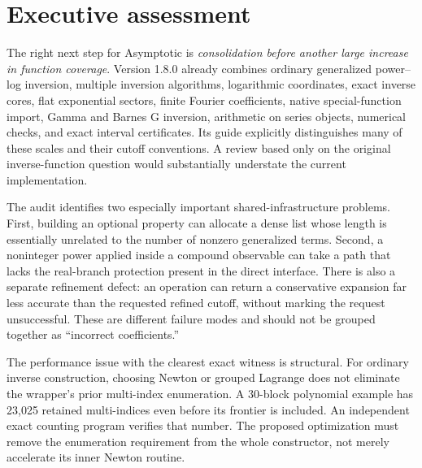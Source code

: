 \documentclass[11pt,a4paper]{article}
\newcommand{\code}[1]{\texttt{\detokenize{#1}}}
\theoremstyle{definition}
\begin{document}
\section*{Executive assessment}

The right next step for Asymptotic is \emph{consolidation before another large increase in function coverage}. Version 1.8.0 already combines ordinary generalized power--log inversion, multiple inversion algorithms, logarithmic coordinates, exact inverse cores, flat exponential sectors, finite Fourier coefficients, native special-function import, Gamma and Barnes G inversion, arithmetic on series objects, numerical checks, and exact interval certificates. Its guide explicitly distinguishes many of these scales and their cutoff conventions. A review based only on the original inverse-function question would substantially understate the current implementation.\cite{repo,guide,core}

The audit identifies two especially important shared-infrastructure problems. First, building an optional \code{SeriesData} property can allocate a dense list whose length is essentially unrelated to the number of nonzero generalized terms. Second, a noninteger power applied inside a compound observable can take a path that lacks the real-branch protection present in the direct \code{SeriesPower} interface. There is also a separate refinement defect: an operation can return a conservative expansion far less accurate than the requested refined cutoff, without marking the request unsuccessful. These are different failure modes and should not be grouped together as ``incorrect coefficients.''\cite{core,operations}

The performance issue with the clearest exact witness is structural. For ordinary inverse construction, choosing Newton or grouped Lagrange does not eliminate the wrapper's prior multi-index enumeration. A 30-block polynomial example has 23,025 retained multi-indices even before its frontier is included. An independent exact counting program verifies that number. The proposed optimization must remove the enumeration requirement from the whole constructor, not merely accelerate its inner Newton routine.\cite{core,incremental}
\end{document}
